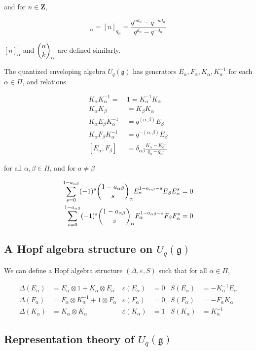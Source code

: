         and for $n \in \mathbf{Z}$,

        \begin{equation}
            [n]_\alpha = [n]_{q_\alpha} = \frac{q^{nd_\alpha} - q^{-nd_\alpha}}{q^{d_\alpha} - q^{-d_\alpha}}
        \end{equation}

        $[n]_\alpha^!$ and $\dbinom{n}{k}_\alpha$ are defined similarly.

        \begin{defn}
            The quantized enveloping algebra $U_q(\mathfrak{g})$ has generators
            $E_\alpha, F_\alpha, K_\alpha, K_\alpha^{-1}$ for each $\alpha \in
            \Pi$, and relations

            \begin{align}
                K_\alpha K_\alpha^{-1} =\ &1  = K_\alpha^{-1}K_\alpha \\
                K_\alpha K_\beta &= K_\beta K_\alpha \\
                K_\alpha E_\beta K_\alpha^{-1} &= q^{(\alpha, \beta)} E_\beta \\
                K_\alpha F_\beta K_\alpha^{-1} &= q^{-(\alpha, \beta)} E_\beta \\
                [E_\alpha, F_\beta] &= \delta_{\alpha\beta} \frac{K_\alpha - K_\alpha^{-1}}{ q_\alpha - q_\alpha^{-1}} 
            \end{align}

            for all $\alpha, \beta \in \Pi$, and for $a \neq \beta$

            \begin{align}
                \sum_{s=0}^{1-a_{\alpha\beta}} (-1)^s \dbinom{1-a_{\alpha\beta}}{s}_\alpha E_\alpha^{1-a_{\alpha\beta} - s} E_\beta E_\alpha^s  &= 0 \\
                \sum_{s=0}^{1-a_{\alpha\beta}} (-1)^s \dbinom{1-a_{\alpha\beta}}{s}_\alpha F_\alpha^{1-a_{\alpha\beta} - s} F_\beta F_\alpha^s  &= 0 
            \end{align}
        \end{defn}
        \subsection{A Hopf algebra structure on $U_q(\mathfrak{g})$}

        We can define a Hopf algebra structure $(\Delta, \varepsilon, S)$ such
        that for all $\alpha \in \Pi$,

        \begin{align}
            \Delta(E_\alpha) &= E_\alpha \otimes 1 + K_\alpha \otimes E_\alpha      & \varepsilon(E_\alpha) &= 0  & S(E_\alpha) &= -K_\alpha^{-1} E_\alpha \\
            \Delta(F_\alpha) &= F_\alpha \otimes K_\alpha^{-1} + 1 \otimes F_\alpha & \varepsilon(F_\alpha) &= 0  & S(F_\alpha) &= -F_\alpha K_\alpha \\
            \Delta(K_\alpha) &= K_\alpha \otimes K_\alpha                           & \varepsilon(K_\alpha) &= 1  & S(K_\alpha) &= K_\alpha^{-1}
        \end{align}
    \subsection{Representation theory of $U_q(\mathfrak{g})$}


